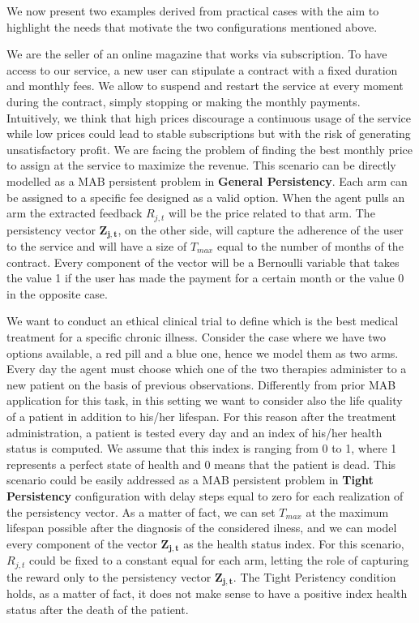 We now present two examples derived from practical cases with the aim to highlight the needs that motivate the two configurations mentioned above. 
\begin{example}
	We are the seller of an online magazine that works via subscription. To have access to our service, a new user can stipulate a contract with a fixed duration and monthly fees. We allow to suspend and restart the service at every moment during the contract, simply stopping or making the monthly payments. Intuitively, we think that high prices discourage a continuous usage of the service while low prices could lead to stable subscriptions but with the risk of generating unsatisfactory profit. We are facing the problem of finding the best monthly price to assign at the service to maximize the revenue. This scenario can be directly modelled as a MAB persistent problem in \textbf{General Persistency}. Each arm can be assigned to a specific fee designed as a valid option. When the agent pulls an arm the extracted feedback $R_{j,t}$ will be the price related to that arm. The persistency vector $\boldsymbol{Z_{j,t}}$, on the other side, will capture the adherence of the user to the service and will have a size of $T_{max}$ equal to the number of months of the contract. Every component of the vector will be a Bernoulli variable that takes the value 1 if the user has made the payment for a certain month or the value 0 in the opposite case.
	\label{magazine}
\end{example}
\begin{example}
	\label{trial}
	We want to conduct an ethical clinical trial to define which is the best medical treatment for a specific chronic illness. Consider the case where we have two options available, a red pill and a blue one, hence we model them as two arms. Every day the agent must choose which one of the two therapies administer to a new patient on the basis of previous observations. Differently from prior MAB application for this task, in this setting we want to consider also the life quality of a patient in addition to his/her lifespan. For this reason after the treatment administration, a patient is tested every day and an index of his/her health status is computed. We assume that this index is ranging from 0 to 1, where 1 represents a perfect state of health and 0 means that the patient is dead. This scenario could be easily addressed as a MAB persistent problem in \textbf{Tight Persistency} configuration with delay steps equal to zero for each realization of the persistency vector. As a matter of fact, we can set $T_{max}$ at the maximum lifespan possible after the diagnosis of the considered ilness, and we can model every component of the vector $\boldsymbol{ Z_ {j, t}} $ as the health status index. For this scenario, $R_{j,t}$ could be fixed to a constant equal for each arm, letting the role of capturing the reward only to the persistency vector $\boldsymbol{ Z_ {j, t}}$. The Tight Peristency condition holds, as a matter of fact, it does not make sense to have a positive index health status after the death of the patient. 
\end{example}

